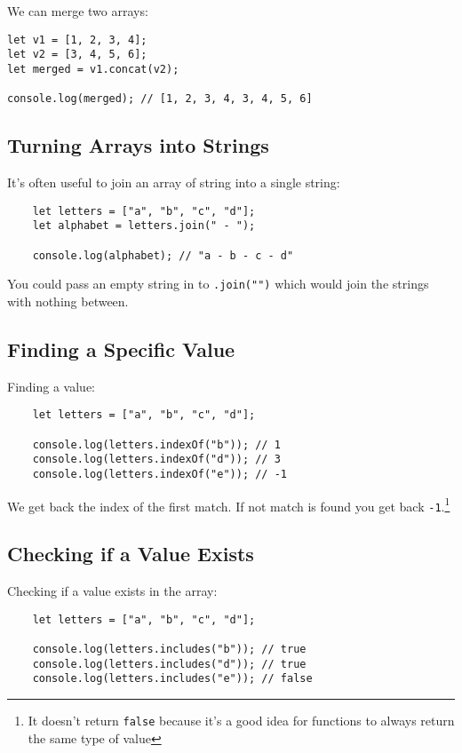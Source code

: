 We can merge two arrays:

\begin{verbatim}
let v1 = [1, 2, 3, 4];
let v2 = [3, 4, 5, 6];
let merged = v1.concat(v2);

console.log(merged); // [1, 2, 3, 4, 3, 4, 5, 6]
\end{verbatim}

\subsection{Turning Arrays into Strings}

It's often useful to join an array of string into a single string:

\begin{verbatim}
    let letters = ["a", "b", "c", "d"];
    let alphabet = letters.join(" - ");

    console.log(alphabet); // "a - b - c - d"
\end{verbatim}

You could pass an empty string in to \texttt{.join("")} which would join the strings with nothing between.

\subsection{Finding a Specific Value}

Finding a value:

\begin{verbatim}
    let letters = ["a", "b", "c", "d"];

    console.log(letters.indexOf("b")); // 1
    console.log(letters.indexOf("d")); // 3
    console.log(letters.indexOf("e")); // -1
\end{verbatim}

We get back the index of the first match. If not match is found you get back \texttt{-1}.\footnote{It doesn't return \texttt{false} because it's a good idea for functions to always return the same type of value}

\subsection{Checking if a Value Exists}

Checking if a value exists in the array:

\begin{verbatim}
    let letters = ["a", "b", "c", "d"];

    console.log(letters.includes("b")); // true
    console.log(letters.includes("d")); // true
    console.log(letters.includes("e")); // false
\end{verbatim}

